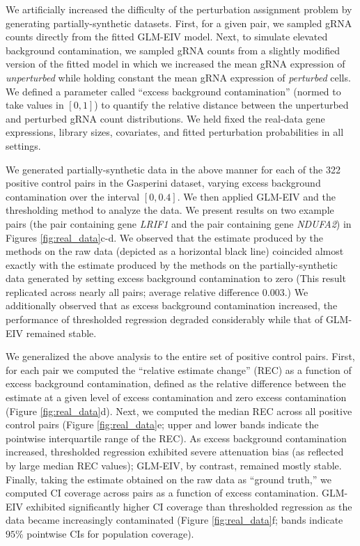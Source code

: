 \documentclass[12pt]{article}
\begin{document}
We artificially increased the difficulty of the perturbation assignment problem by generating partially-synthetic datasets. First, for a given pair, we sampled gRNA counts directly from the fitted GLM-EIV model. Next, to simulate elevated background contamination, we sampled gRNA counts from a slightly modified version of the fitted model in which we increased the mean gRNA expression of \textit{unperturbed} while holding constant the mean gRNA expression of \textit{perturbed} cells. We defined a parameter called ``excess background contamination'' (normed to take values in $[0,1]$) to quantify the relative distance between the unperturbed and perturbed gRNA count distributions.  We held fixed the real-data gene expressions, library sizes, covariates, and fitted perturbation probabilities in all settings.

We generated partially-synthetic data in the above manner for each of the 322 positive control pairs in the Gasperini dataset, varying excess background contamination over the interval $[0,0.4].$ We then applied GLM-EIV and the thresholding method to analyze the data. We present results on two example pairs (the pair containing gene \textit{LRIF1} and the pair containing gene \textit{NDUFA2}) in Figures \ref{fig:real_data}c-d. We observed that the estimate produced by the methods on the raw data (depicted as a horizontal black line) coincided almost exactly with the estimate produced by the methods on the partially-synthetic data generated by setting excess background contamination to zero (This result replicated across nearly all pairs; average relative difference $0.003$.) We additionally observed that as excess background contamination increased, the performance of thresholded regression degraded considerably while that of GLM-EIV remained stable.

We generalized the above analysis to the entire set of positive control pairs. First, for each pair we computed the ``relative estimate change'' (REC) as a function of excess background contamination, defined as the relative difference between the estimate at a given level of excess contamination and zero excess contamination (Figure \ref{fig:real_data}d). Next, we computed the median REC across all positive control pairs (Figure \ref{fig:real_data}e; upper and lower bands indicate the pointwise interquartile range of the REC). As excess background contamination increased, thresholded regression exhibited severe attenuation bias (as reflected by large median REC values); GLM-EIV, by contrast, remained mostly stable. Finally, taking the estimate obtained on the raw data as ``ground truth,'' we computed CI coverage across pairs as a function of excess contamination. GLM-EIV exhibited significantly higher CI coverage than thresholded regression as the data became increasingly contaminated (Figure \ref{fig:real_data}f; bands indicate $95\%$ pointwise CIs for population coverage). 
\end{document}

